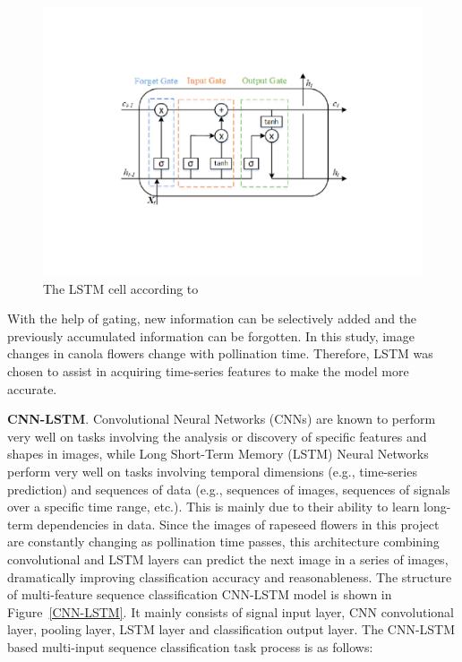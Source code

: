 \documentclass[11pt,a4paper]{article}
\begin{document}
\begin{spacing}{1.5}
\begin{figure}[ht]
	\centering
	\includegraphics[scale=0.4]{LSTM-cell-according-to-Hochreiter-and-Schmidhuber-1997}
	\caption{The LSTM cell according to \citet{app122412980}}
	\label{LSTM}
\end{figure}

With the help of gating, new information can be selectively added and the previously accumulated information can be forgotten.
In this study, image changes in canola flowers change with pollination time. Therefore, LSTM was chosen to assist in acquiring time-series features to make the model more accurate.

\textbf{CNN-LSTM}.
Convolutional Neural Networks (CNNs) are known to perform very well on tasks involving the analysis or discovery of specific features and shapes in images, while Long Short-Term Memory (LSTM) Neural Networks perform very well on tasks involving temporal dimensions (e.g., time-series prediction) and sequences of data (e.g., sequences of images, sequences of signals over a specific time range, etc.).
This is mainly due to their ability to learn long-term dependencies in data. Since the images of rapeseed flowers in this project are constantly changing as pollination time passes, this architecture combining convolutional and LSTM layers can predict the next image in a series of images, dramatically improving classification accuracy and reasonableness.
The structure of multi-feature sequence classification CNN-LSTM model is shown in Figure~\ref{CNN-LSTM}. It mainly consists of signal input layer, CNN convolutional layer, pooling layer, LSTM layer and classification output layer. The CNN-LSTM based multi-input sequence classification task process is as follows:


\end{spacing}
\end{document}
